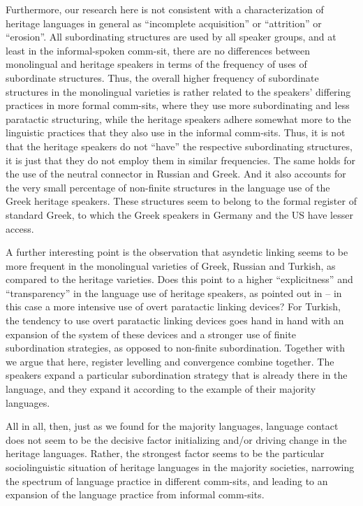 \documentclass[output=paper,colorlinks,citecolor=brown]{langscibook}
\begin{document}
Furthermore, our research here is not consistent with a characterization of heritage languages in general as “incomplete acquisition” or “attrition” or “erosion”. All subordinating structures are used by all speaker groups, and at least in the informal-spoken comm-sit, there are no differences between monolingual and heritage speakers in terms of the frequency of uses of subordinate structures. Thus, the overall higher frequency of subordinate structures in the monolingual varieties is rather related to the speakers’ differing practices in more formal comm-sits, where they use more subordinating and less paratactic structuring, while the heritage speakers adhere somewhat more to the linguistic practices that they also use in the informal comm-sits. Thus, it is not that the heritage speakers do not “have” the respective subordinating structures, it is just that they do not employ them in similar frequencies. The same holds for the use of the neutral connector in Russian and Greek. And it also accounts for the very small percentage of non-finite structures in the language use of the Greek heritage speakers. These structures seem to belong to the formal register of standard Greek, to which the Greek speakers in Germany and the US have lesser access.

A further interesting point is the observation that asyndetic linking seems to be more frequent in the monolingual varieties of Greek, Russian and Turkish, as compared to the heritage varieties. Does this point to a higher “explicitness” and “transparency” in the language use of heritage speakers, as pointed out in \textcite{polinsky2018heritage}  – in this case a more intensive use of overt paratactic linking devices? For Turkish, the tendency to use overt paratactic linking devices goes hand in hand with an expansion of the system of these devices and a stronger use of finite subordination strategies, as opposed to non-finite subordination. Together with \textcite{ozsoy2022shifting} we argue that here, register levelling and convergence combine together. The speakers expand a particular subordination strategy that is already there in the language, and they expand it according to the example of their majority languages. 

All in all, then, just as we found for the majority languages, language contact does not seem to be the decisive factor initializing and/or driving change in the heritage languages. Rather, the strongest factor seems to be the particular sociolinguistic situation of heritage languages in the majority societies, narrowing the spectrum of language practice in different comm-sits, and leading to an expansion of the language practice from informal comm-sits.
\end{document}
